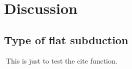 
\chapter{Discussion}

\section{Type of flat subduction}

This is just to test \cite{Krasnogor2004e} the cite function.